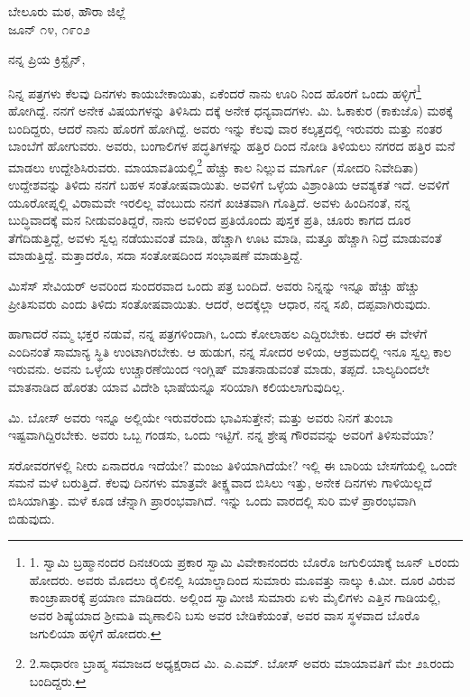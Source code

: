 \begin{flushright}
ಬೇಲೂರು ಮಠ, ಹೌರಾ ಜಿಲ್ಲೆ\\ಜೂನ್ ೧೪, ೧೯೦೨
\end{flushright}

ನನ್ನ ಪ್ರಿಯ ಕ್ರಿಸ್ಟೈನ್,

ನಿನ್ನ ಪತ್ರಗಳು ಕೆಲವು ದಿನಗಳು ಕಾಯಬೇಕಾಯಿತು, ಏಕೆಂದರೆ ನಾನು ಊರಿ ನಿಂದ ಹೊರಗೆ ಒಂದು ಹಳ್ಳಿಗೆ\footnote{1. ಸ್ವಾಮಿ ಬ್ರಹ್ಮಾನಂದರ ದಿನಚರಿಯ ಪ್ರಕಾರ ಸ್ವಾಮಿ ವಿವೇಕಾನಂದರು ಬೊರೊ ಜಗುಲಿಯಾಕ್ಕೆ ಜೂನ್ ೬ರಂದು ಹೋದರು. ಅವರು ಮೊದಲು ರೈಲಿನಲ್ಲಿ ಸಿಯಾಲ್ಡಾದಿಂದ ಸುಮಾರು ಮೂವತ್ತು ನಾಲ್ಕು ಕಿ.ಮೀ. ದೂರ ವಿರುವ ಕಾಂಚ್ರಾಪಾರಕ್ಕೆ ಪ್ರಯಾಣ ಮಾಡಿದರು. ಅಲ್ಲಿಂದ ಸ್ವಾಮೀಜಿ ಸುಮಾರು ಏಳು ಮೈಲಿಗಳು ಎತ್ತಿನ ಗಾಡಿಯಲ್ಲಿ, ಅವರ ಶಿಷ್ಯೆಯಾದ ಶ‍್ರೀಮತಿ ಮೃಣಾಲಿನಿ ಬಸು ಅವರ ಬೇಡಿಕೆಯಂತೆ, ಅವರ ವಾಸ ಸ್ಥಳವಾದ ಬೊರೊ ಜಗುಲಿಯಾ ಹಳ್ಳಿಗೆ ಹೋದರು.} ಹೋಗಿದ್ದೆ. ನನಗೆ ಅನೇಕ ವಿಷಯಗಳನ್ನು ತಿಳಿಸಿದು ದಕ್ಕೆ ಅನೇಕ ಧನ್ಯವಾದಗಳು. ಮಿ. ಓಕಾಕುರ (ಕಾಕುಜೊ) ಮಠಕ್ಕೆ ಬಂದಿದ್ದರು, ಆದರೆ ನಾನು ಹೊರಗೆ ಹೋಗಿದ್ದೆ. ಅವರು ಇನ್ನು ಕೆಲವು ವಾರ ಕಲ್ಕತ್ತದಲ್ಲಿ ಇರುವರು ಮತ್ತು ನಂತರ ಬಾಂಬೆಗೆ ಹೋಗುವರು. ಅವರು, ಬಂಗಾಲಿಗಳ ಪದ್ಧತಿಗಳನ್ನು ಹತ್ತಿರ ದಿಂದ ನೋಡಿ ತಿಳಿಯಲು ನಗರದ ಹತ್ತಿರ ಮನೆ ಮಾಡಲು ಉದ್ದೇಶಿಸಿರುವರು. ಮಾಯಾವತಿಯಲ್ಲಿ\footnote{2.ಸಾಧಾರಣ ಬ್ರಾಹ್ಮ ಸಮಾಜದ ಅಧ್ಯಕ್ಷರಾದ ಮಿ. ಎ.ಎಮ್​. ಬೋಸ್ ಅವರು ಮಾಯಾವತಿಗೆ ಮೇ ೨೩ರಂದು ಬಂದಿದ್ದರು.} ಹೆಚ್ಚು ಕಾಲ ನಿಲ್ಲುವ ಮಾರ್ಗೊ (ಸೋದರಿ ನಿವೇದಿತಾ) ಉದ್ದೇಶವನ್ನು ತಿಳಿದು ನನಗೆ ಬಹಳ ಸಂತೋಷವಾಯಿತು. ಅವಳಿಗೆ ಒಳ್ಳೆಯ ವಿಶ್ರಾಂತಿಯ ಆವಶ್ಯಕತೆ ಇದೆ. ಅವಳಿಗೆ ಯೂರೋಪ್ನಲ್ಲಿ ವಿರಾಮವೇ ಇರಲಿಲ್ಲ ವೆಂಬುದು ನನಗೆ ಖಚಿತವಾಗಿ ಗೊತ್ತಿದೆ. ಅವಳು ಹಿಂದಿನಂತೆ, ನನ್ನ ಬುದ್ಧಿವಾದಕ್ಕೆ ಮನ ನೀಡುವಂತಿದ್ದರೆ, ನಾನು ಅವಳಿಂದ ಪ್ರತಿಯೊಂದು ಪುಸ್ತಕ ಪ್ರತಿ, ಚೂರು ಕಾಗದ ದೂರ ತೆಗೆದಿಡುತ್ತಿದ್ದೆ, ಅವಳು ಸ್ವಲ್ಪ ನಡೆಯುವಂತೆ ಮಾಡಿ, ಹೆಚ್ಚಾಗಿ ಊಟ ಮಾಡಿ, ಮತ್ತೂ ಹೆಚ್ಚಾಗಿ ನಿದ್ರೆ ಮಾಡುವಂತೆ ಮಾಡುತ್ತಿದ್ದೆ. ಮತ್ತಾದರೊ, ಸದಾ ಸಂತೋಷದಿಂದ ಸಂಭಾಷಣೆ ಮಾಡುತ್ತಿದ್ದೆ.

ಮಿಸೆಸ್ ಸೇವಿಯರ್ ಅವರಿಂದ ಸುಂದರವಾದ ಒಂದು ಪತ್ರ ಬಂದಿದೆ. ಅವರು ನಿನ್ನನ್ನು ಇನ್ನೂ ಹೆಚ್ಚು ಹೆಚ್ಚು ಪ್ರೀತಿಸುವರು ಎಂದು ತಿಳಿದು ಸಂತೋಷವಾಯಿತು. ಆದರೆ, ಅದಕ್ಕೆಲ್ಲಾ ಆಧಾರ, ನನ್ನ ಸಖಿ, ದಪ್ಪವಾಗಿರುವುದು.

ಹಾಗಾದರೆ ನಮ್ಮ ಭಕ್ತರ ನಡುವೆ, ನನ್ನ ಪತ್ರಗಳಿಂದಾಗಿ, ಒಂದು ಕೋಲಾಹಲ ಎದ್ದಿರಬೇಕು. ಆದರೆ ಈ ವೇಳೆಗೆ ಎಂದಿನಂತೆ ಸಾಮಾನ್ಯ ಸ್ಥಿತಿ ಉಂಟಾಗಿರಬೇಕು. ಆ ಹುಡುಗ, ನನ್ನ ಸೋದರ ಅಳಿಯ, ಆಶ್ರಮದಲ್ಲಿ ಇನೂ ಸ್ವಲ್ಪ ಕಾಲ ಇರುವನು. ಅವನು ಒಳ್ಳೆಯ ಉಚ್ಚಾರಣೆಯಿಂದ ಇಂಗ್ಲಿಷ್ ಮಾತನಾಡುವಂತೆ ಮಾಡು, ತಪ್ಪದೆ. ಬಾಲ್ಯದಿಂದಲೇ ಮಾತನಾಡಿದ ಹೊರತು ಯಾವ ವಿದೇಶಿ ಭಾಷೆಯನ್ನೂ ಸರಿಯಾಗಿ ಕಲಿಯಲಾಗುವುದಿಲ್ಲ.

ಮಿ. ಬೋಸ್ ಅವರು ಇನ್ನೂ ಅಲ್ಲಿಯೇ ಇರುವರೆಂದು ಭಾವಿಸುತ್ತೇನೆ; ಮತ್ತು ಅವರು ನಿನಗೆ ತುಂಬಾ ಇಷ್ಟವಾಗಿದ್ದಿರಬೇಕು. ಅವರು ಒಬ್ಬ ಗಂಡಸು, ಒಂದು ಇಟ್ಟಿಗೆ. ನನ್ನ ಶ್ರೇಷ್ಠ ಗೌರವವನ್ನು ಅವರಿಗೆ ತಿಳಿಸುವೆಯಾ?

ಸರೋವರಗಳಲ್ಲಿ ನೀರು ಏನಾದರೂ ಇದೆಯೇ? ಮಂಜು ತಿಳಿಯಾಗಿದೆಯೇ? ಇಲ್ಲಿ ಈ ಬಾರಿಯ ಬೇಸಗೆಯಲ್ಲಿ ಒಂದೇ ಸಮನೆ ಮಳೆ ಬರುತ್ತಿದೆ. ಕೆಲವು ದಿನಗಳು ಮಾತ್ರವೇ ತೀಕ್ಷ್ಣವಾದ ಬಿಸಿಲು ಇತ್ತು, ಅನೇಕ ದಿನಗಳು ಗಾಳಿಯಿಲ್ಲದೆ ಬಿಸಿಯಾಗಿತ್ತು. ಮಳೆ ಕೂಡ ಚೆನ್ನಾಗಿ ಪ್ರಾರಂಭವಾಗಿದೆ. ಇನ್ನು ಒಂದು ವಾರದಲ್ಲಿ ಸುರಿ ಮಳೆ ಪ್ರಾರಂಭವಾಗಿ ಬಿಡುವುದು.

